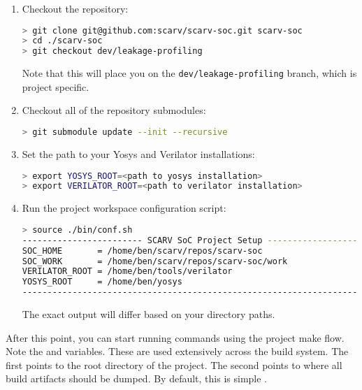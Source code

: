 \begin{enumerate}

\item Checkout the repository:

\begin{lstlisting}[language=bash,style=block]
> git clone git@github.com:scarv/scarv-soc.git scarv-soc
> cd ./scarv-soc
> git checkout dev/leakage-profiling
\end{lstlisting}

Note that this will place you on the {\tt dev/leakage-profiling}
branch, which is project specific.

\item Checkout all of the repository submodules:

\begin{lstlisting}[language=bash,style=block]
> git submodule update --init --recursive
\end{lstlisting}

\item Set the path to your Yosys and Verilator installations:

\begin{lstlisting}[language=bash,style=block]
> export YOSYS_ROOT=<path to yosys installation>
> export VERILATOR_ROOT=<path to verilator installation>
\end{lstlisting}

\item Run the project workspace configuration script:

\begin{lstlisting}[language=bash,style=block]
> source ./bin/conf.sh
------------------------ SCARV SoC Project Setup ----------------------
SOC_HOME       = /home/ben/scarv/repos/scarv-soc
SOC_WORK       = /home/ben/scarv/repos/scarv-soc/work
VERILATOR_ROOT = /home/ben/tools/verilator
YOSYS_ROOT     = /home/ben/yosys
-----------------------------------------------------------------------
\end{lstlisting}

The exact output will differ based on your directory paths.

\end{enumerate}

After this point, you can start running commands using the project
make flow.
Note the \SOCHOME and \SOCWORK variables.
These are used extensively across the build system.
The first points to the root directory of the project.
The second points to where all build artifacts should be dumped.
By default, this is simple .

